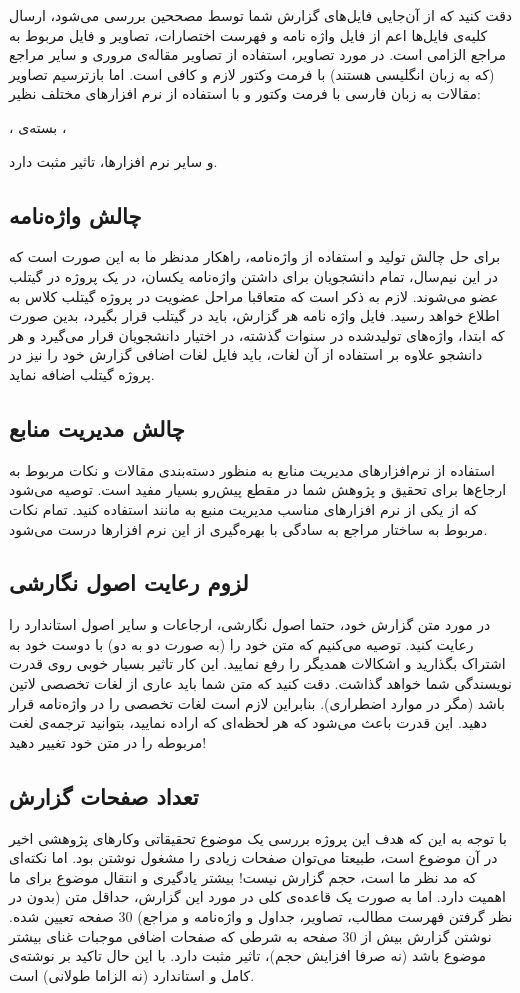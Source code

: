 دقت کنید که از آن‌جایی فایل‌های گزارش شما توسط مصححین بررسی می‌شود، ارسال کلیه‌ی فایل‌ها اعم از فایل واژه نامه و فهرست اختصارات، تصاویر و فایل مربوط به مراجع الزامی است. در مورد تصاویر، استفاده از تصاویر مقاله‌ی مروری و سایر مراجع (که به زبان انگلیسی هستند) با فرمت وکتور لازم و کافی است. اما بازترسیم تصاویر مقالات به زبان فارسی با فرمت وکتور و با استفاده از نرم افزار‌های مختلف نظیر:  
\begin{itemize}
\X{}،
\X
بسته‌ی 
،
\X
{}
\end{itemize}
و سایر نرم افزار‌ها، تاثیر مثبت دارد. 
\subsection{چالش واژه‌‌نامه}
برای حل چالش‌ تولید و استفاده از واژه‌نامه،  راهکار مدنظر ما به این صورت است که در این نیم‌سال، تمام دانشجویان برای داشتن واژه‌نامه یکسان، در یک پروژه در گیتلب عضو  می‌شوند. لازم به ذکر است که متعاقبا مراحل عضویت در پروژه گیتلب کلاس به اطلاع خواهد رسید. فایل واژه نامه هر گزارش، باید در گیتلب قرار بگیرد، بدین صورت که ابتدا، واژه‌های تولید‌شده‌ در سنوات گذشته، در اختیار دانشجویان قرار می‌گیرد و هر دانشجو علاوه بر استفاده از آن لغات، باید فایل لغات اضافی گزارش خود را نیز در پروژه گیتلب اضافه نماید. 

\subsection{چالش مدیریت منابع}
استفاده از نرم‌افزار‌های مدیریت منابع به منظور دسته‌بندی  مقالات و نکات مربوط به ارجا‌ع‌ها برای تحقیق و پژوهش شما در مقطع پیش‌رو بسیار مفید است. توصیه می‌شود که از یکی از نرم افزار‌های مناسب مدیریت منبع به مانند
	\href{https://www.mendeley.com/download-desktop-new/}{}
	استفاده کنید. تمام نکات مربوط به ساختار مراجع به سادگی با بهره‌گیری از این نرم افزار‌ها درست می‌شود.
	
\subsection{لزوم رعایت اصول نگارشی}
در مورد متن گزارش خود، حتما اصول نگارشی، ارجاعات و سایر اصول استاندارد را رعایت کنید. توصیه می‌کنیم که متن خود را (به صورت دو به دو) با دوست خود به اشتراک بگذارید و اشکالات همدیگر را رفع نمایید. این کار تاثیر بسیار خوبی روی قدرت نویسندگی شما خواهد گذاشت. دقت کنید که متن شما باید عاری از لغات تخصصی لاتین باشد (مگر در موارد اضطراری). بنابراین لازم است لغات تخصصی را در واژه‌نامه قرار دهید. این قدرت باعث می‌شود که هر لحظه‌ای که اراده نمایید، بتوانید ترجمه‌ی لغت مربوطه را در متن خود تغییر دهید! 
\subsection{  تعداد صفحات گزارش}
با توجه به این که هدف این پروژه بررسی یک موضوع تحقیقاتی وکار‌های پژوهشی اخیر در آن موضوع است، طبیعتا می‌توان صفحات زیادی را مشغول نوشتن بود. اما نکته‌ای که مد نظر ما است، حجم گزارش نیست! بیشتر یادگیری و انتقال موضوع برای ما اهمیت دارد. اما به صورت یک قاعده‌ی کلی در مورد این گزارش، حداقل متن (بدون در نظر گرفتن فهرست‌ مطالب، تصاویر، جداول و واژه‌نامه و مراجع) 30 صفحه تعیین شده.  نوشتن گزارش بیش از 30  صفحه به شرطی که صفحات اضافی موجبات غنای بیشتر موضوع باشد (نه صرفا افزایش حجم)، تاثیر مثبت دارد. با این حال تاکید بر نوشته‌ی کامل و استاندارد (نه الزاما طولانی) است. 
